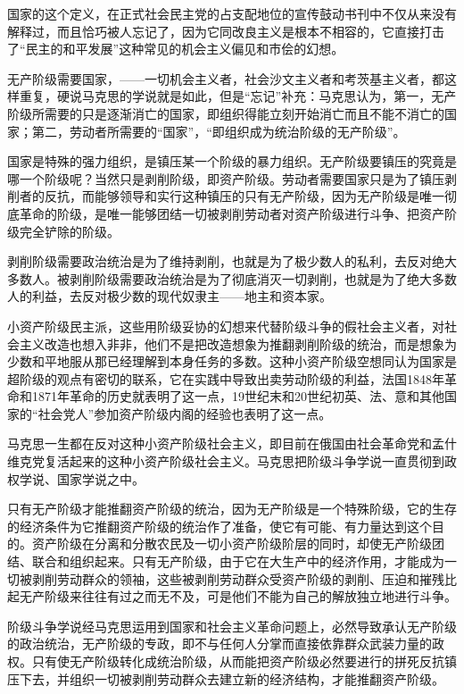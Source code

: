 \documentclass[UTF8, 12pt, a4paper]{ctexrep}
\begin{document}
国家的这个定义，在正式社会民主党的占支配地位的宣传鼓动书刊中不仅从来没有解释过，而且恰巧被人忘记了，因为它同改良主义是根本不相容的，它直接打击了“民主的和平发展”这种常见的机会主义偏见和市侩的幻想。

无产阶级需要国家，——一切机会主义者，社会沙文主义者和考茨基主义者，都这样重复，硬说马克思的学说就是如此，但是“忘记”补充：马克思认为，第一，无产阶级所需要的只是逐渐消亡的国家，即组织得能立刻开始消亡而且不能不消亡的国家；第二，劳动者所需要的“国家”，“即组织成为统治阶级的无产阶级”。

国家是特殊的强力组织，是镇压某一个阶级的暴力组织。无产阶级要镇压的究竟是哪一个阶级呢？当然只是剥削阶级，即资产阶级。劳动者需要国家只是为了镇压剥削者的反抗，而能够领导和实行这种镇压的只有无产阶级，因为无产阶级是唯一彻底革命的阶级，是唯一能够团结一切被剥削劳动者对资产阶级进行斗争、把资产阶级完全铲除的阶级。

剥削阶级需要政治统治是为了维持剥削，也就是为了极少数人的私利，去反对绝大多数人。被剥削阶级需要政治统治是为了彻底消灭一切剥削，也就是为了绝大多数人的利益，去反对极少数的现代奴隶主——地主和资本家。

小资产阶级民主派，这些用阶级妥协的幻想来代替阶级斗争的假社会主义者，对社会主义改造也想入非非，他们不是把改造想象为推翻剥削阶级的统治，而是想象为少数和平地服从那已经理解到本身任务的多数。这种小资产阶级空想同认为国家是超阶级的观点有密切的联系，它在实践中导致出卖劳动阶级的利益，法国1848年革命和1871年革命的历史就表明了这一点，19世纪末和20世纪初英、法、意和其他国家的“社会党人”参加资产阶级内阁的经验也表明了这一点。

马克思一生都在反对这种小资产阶级社会主义，即目前在俄国由社会革命党和孟什维克党复活起来的这种小资产阶级社会主义。马克思把阶级斗争学说一直贯彻到政权学说、国家学说之中。

只有无产阶级才能推翻资产阶级的统治，因为无产阶级是一个特殊阶级，它的生存的经济条件为它推翻资产阶级的统治作了准备，使它有可能、有力量达到这个目的。资产阶级在分离和分散农民及一切小资产阶级阶层的同时，却使无产阶级团结、联合和组织起来。只有无产阶级，由于它在大生产中的经济作用，才能成为一切被剥削劳动群众的领袖，这些被剥削劳动群众受资产阶级的剥削、压迫和摧残比起无产阶级来往往有过之而无不及，可是他们不能为自己的解放独立地进行斗争。

阶级斗争学说经马克思运用到国家和社会主义革命问题上，必然导致承认无产阶级的政治统治，无产阶级的专政，即不与任何人分掌而直接依靠群众武装力量的政权。只有使无产阶级转化成统治阶级，从而能把资产阶级必然要进行的拼死反抗镇压下去，并组织一切被剥削劳动群众去建立新的经济结构，才能推翻资产阶级。
\end{document}
